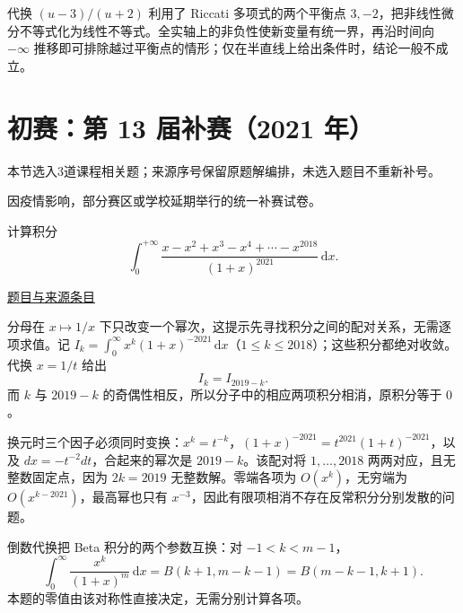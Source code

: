 \documentclass[12pt,fontset=fandol]{ctexart}
\begin{document}
\begin{remark}[方法与条件]代换 $(u-3)/(u+2)$ 利用了 Riccati 多项式的两个平衡点 $3,-2$，把非线性微分不等式化为线性不等式。全实轴上的非负性使新变量有统一界，再沿时间向 $-\infty$ 推移即可排除越过平衡点的情形；仅在半直线上给出条件时，结论一般不成立。\end{remark}

\section{初赛：第 13 届补赛（2021 年）}

本节选入3道课程相关题；来源序号保留原题解编排，未选入题目不重新补号。

\begin{remark}[来源说明]因疫情影响，部分赛区或学校延期举行的统一补赛试卷。\end{remark}

\begin{example}[来源序号2]\label{ex:ch08-13th-A-makeup:2}\label{pr:ch08-13th-A-makeup:2}

计算积分
\[
\int_{0}^{+\infty}\frac{x-x^{2}+x^{3}-x^{4}+\cdots-x^{2018}}{(1+x)^{2021}}\,\mathrm{d}x.
\]

\par\href{https://github.com/lzxcr/cmc-mathematics/blob/64916fa1fdbc3e444a652eca204d5669058ee321/src/problems/preliminary/13-makeup/02.md}{题目与来源条目}

\end{example}

\begin{solve}\label{ans:ch08-13th-A-makeup:2}

分母在 $x\mapsto1/x$ 下只改变一个幂次，这提示先寻找积分之间的配对关系，无需逐项求值。记 $I_k=\int_0^\infty x^k(1+x)^{-2021}\,\mathrm dx$（$1\leq k\leq2018$）；这些积分都绝对收敛。代换 $x=1/t$ 给出
\[
I_k=I_{2019-k}.
\]
而 $k$ 与 $2019-k$ 的奇偶性相反，所以分子中的相应两项积分相消，原积分等于 $0$。

换元时三个因子必须同时变换：$x^k=t^{-k}$，$(1+x)^{-2021}=t^{2021}(1+t)^{-2021}$，以及 $dx=-t^{-2}dt$，合起来的幂次是 $2019-k$。该配对将 $1,\ldots,2018$ 两两对应，且无整数固定点，因为 $2k=2019$ 无整数解。零端各项为 $O(x^k)$，无穷端为 $O(x^{k-2021})$，最高幂也只有 $x^{-3}$，因此有限项相消不存在反常积分分别发散的问题。

\end{solve}

\begin{remark}[方法与条件]倒数代换把 Beta 积分的两个参数互换：对 $-1<k<m-1$，
\[
\int_0^\infty\frac{x^k}{(1+x)^m}\,\mathrm dx
=B(k+1,m-k-1)=B(m-k-1,k+1).
\]
本题的零值由该对称性直接决定，无需分别计算各项。\end{remark}
\end{document}
